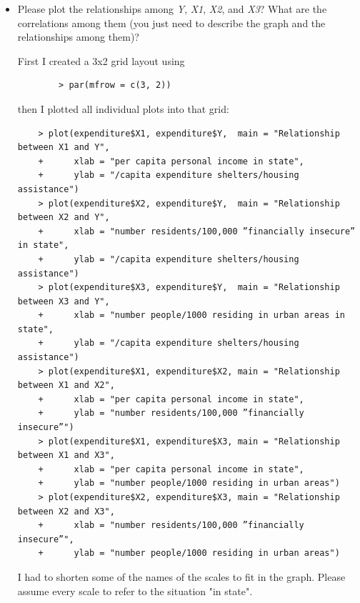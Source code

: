 \documentclass[12pt,letterpaper]{article}
\begin{document}
\vspace{.5cm}
\begin{itemize}

\item
Please plot the relationships among \emph{Y}, \emph{X1}, \emph{X2}, and \emph{X3}? What are the correlations among them (you just need to describe the graph and the relationships among them)?


First I created a 3x2 grid layout using 
	\begin{verbatim}
		> par(mfrow = c(3, 2))
			\end{verbatim}
then I plotted all individual plots into that grid:
\begin{verbatim}
	> plot(expenditure$X1, expenditure$Y,  main = "Relationship between X1 and Y",  
	+      xlab = "per capita personal income in state", 
	+      ylab = "/capita expenditure shelters/housing assistance")
	> plot(expenditure$X2, expenditure$Y,  main = "Relationship between X2 and Y",  
	+      xlab = "number residents/100,000 ”financially insecure” in state", 
	+      ylab = "/capita expenditure shelters/housing assistance")
	> plot(expenditure$X3, expenditure$Y,  main = "Relationship between X3 and Y",  
	+      xlab = "number people/1000 residing in urban areas in state", 
	+      ylab = "/capita expenditure shelters/housing assistance")
	> plot(expenditure$X1, expenditure$X2, main = "Relationship between X1 and X2", 
	+      xlab = "per capita personal income in state", 
	+      ylab = "number residents/100,000 ”financially insecure”")
	> plot(expenditure$X1, expenditure$X3, main = "Relationship between X1 and X3", 
	+      xlab = "per capita personal income in state", 
	+      ylab = "number people/1000 residing in urban areas")
	> plot(expenditure$X2, expenditure$X3, main = "Relationship between X2 and X3", 
	+      xlab = "number residents/100,000 ”financially insecure”", 
	+      ylab = "number people/1000 residing in urban areas")
		\end{verbatim}
		
I had to shorten some of the names of the scales to fit in the graph. Please assume every scale to refer to the situation "in state".



\end{itemize}
\end{document}
